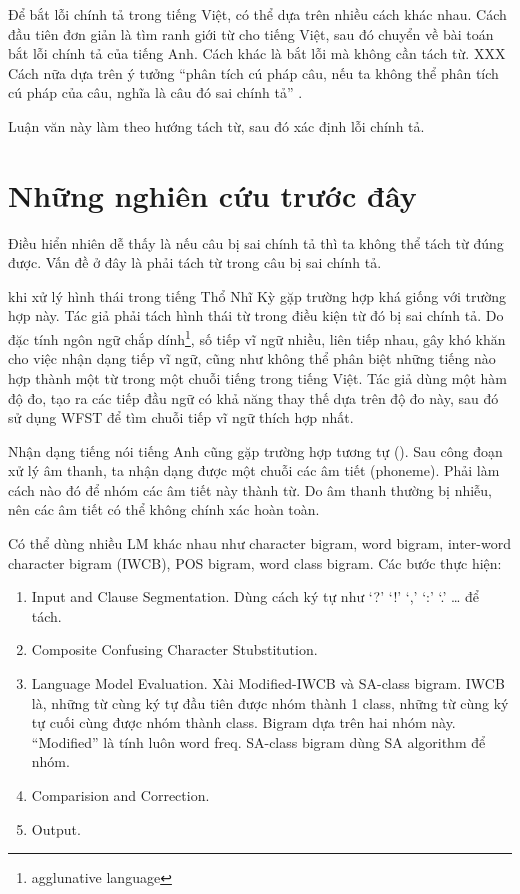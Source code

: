 \documentclass[a4paper,oneside]{book} %
\begin{document}
Để bắt lỗi chính tả trong tiếng Việt, có thể dựa trên nhiều cách khác
nhau. Cách đầu tiên đơn giản là tìm ranh giới từ cho tiếng Việt, sau
đó chuyển về bài toán bắt lỗi chính tả của tiếng Anh. Cách khác
là bắt lỗi mà không cần tách từ. XXX \cite{Tuoi}
Cách nữa dựa trên ý tưởng ``phân tích cú pháp câu, nếu ta không thể
phân tích cú pháp của câu, nghĩa là câu đó sai chính tả'' \cite{iccc}.

Luận văn này làm theo hướng tách từ, sau đó xác định lỗi chính tả.

\section{Những nghiên cứu trước đây}

Điều hiển nhiên dễ thấy là nếu câu bị sai chính tả thì ta không thể
tách từ đúng được. Vấn đề ở đây là phải tách từ trong câu bị sai chính
tả.

\cite{Oflazer} khi xử lý hình thái trong tiếng Thổ Nhĩ Kỳ gặp trường
hợp khá giống với trường hợp này. Tác giả phải tách hình thái từ
trong điều kiện từ đó bị sai chính tả. Do đặc tính
ngôn ngữ chắp dính\footnote{agglunative language}, số tiếp vĩ ngữ
nhiều, liên tiếp nhau, gây khó khăn cho việc nhận dạng tiếp vĩ ngữ,
cũng như không thể phân biệt những tiếng nào hợp thành một từ trong
một chuỗi tiếng trong tiếng Việt. Tác giả dùng một hàm độ đo, tạo ra
các tiếp đầu ngữ có khả năng thay thế dựa trên độ đo này, sau đó sử
dụng WFST để tìm chuỗi tiếp vĩ ngữ thích hợp nhất.

Nhận dạng tiếng nói tiếng Anh cũng gặp trường hợp tương tự
(\cite{Ravishankar}). Sau công đoạn xử lý âm thanh, ta nhận dạng được
một chuỗi các âm tiết (phoneme). Phải làm cách nào đó để nhóm các âm
tiết này thành từ. Do âm thanh thường bị nhiễu, nên các âm tiết có thể
không chính xác hoàn toàn.

\cite{Chang} Có thể dùng nhiều LM khác nhau như character
bigram, word bigram, inter-word character bigram (IWCB), POS bigram,
word class bigram. Các bước thực hiện:
\begin{enumerate}
\item Input and Clause Segmentation. Dùng cách ký tự như `?' `!' `,'
  `:' `.' \ldots{} để tách.
\item Composite Confusing Character Stubstitution. 
\item Language Model Evaluation. Xài Modified-IWCB và SA-class
  bigram. IWCB là, những từ cùng ký tự đầu tiên được nhóm thành 1
  class, những từ cùng ký tự cuối cùng được nhóm thành class. Bigram
  dựa trên hai nhóm này. ``Modified'' là tính luôn word freq. SA-class
  bigram dùng SA algorithm để nhóm.
\item Comparision and Correction.
\item Output.
\end{enumerate}
\end{document}
